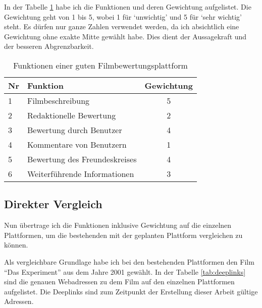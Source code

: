 In der Tabelle \ref{tab:funktionen} habe ich die Funktionen und deren Gewichtung
aufgelistet. Die Gewichtung geht von 1 bis 5, wobei 1 für `unwichtig' und 5 für
`sehr wichtig' steht. Es dürfen nur ganze Zahlen verwendet werden, da ich 
absichtlich eine Gewichtung ohne exakte Mitte gewählt habe. Dies dient der
Aussagekraft und der besseren Abgrenzbarkeit.

\begin{table}[h]
\begin{center}
    \begin{tabular}{llc}
        \toprule Nr & Funktion & Gewichtung \\
        \midrule 1 & Filmbeschreibung & 5 \\
        \midrule 2 & Redaktionelle Bewertung & 2 \\
        \midrule 3 & Bewertung durch Benutzer & 4 \\
        \midrule 4 & Kommentare von Benutzern & 1 \\
        \midrule 5 & Bewertung des Freundeskreises & 4 \\
        \midrule 6 & Weiterführende Informationen & 3 \\
        \bottomrule
    \end{tabular}
    \caption{Funktionen einer guten Filmbewertungsplattform}
    \label{tab:funktionen}
\end{center}
\end{table}

\subsection{Direkter Vergleich}
Nun übertrage ich die Funktionen inklusive Gewichtung auf die einzelnen Plattformen,
um die bestehenden mit der geplanten Plattform vergleichen zu können.

Als vergleichbare Grundlage habe ich bei den bestehenden Plattformen den Film 
``Das Experiment'' aus dem Jahre 2001 gewählt. In der Tabelle \ref{tab:deeplinks} 
sind die genauen Webadressen zu dem Film auf den einzelnen Plattformen aufgelistet. 
Die Deeplinks sind zum Zeitpunkt der Erstellung dieser Arbeit gültige Adressen.

